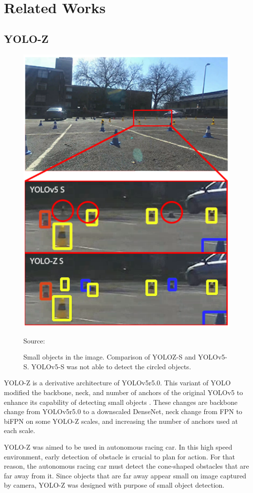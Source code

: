\section{Related Works}
\label{section:relatedwork}

  \subsection{YOLO-Z}
  \begin{figure}[H]
    \centering
    \includegraphics[width=.7\textwidth]{figures/yoloz-result.png}
    \caption*{Source: \textcite{yoloz}}
    \caption{Small objects in the image. Comparison of YOLOZ-S and YOLOv5-S. YOLOv5-S was not able to detect the circled objects.}
    \label{fig:yolozcone}
  \end{figure}
  YOLO-Z is a derivative architecture of YOLOv5r5.0.
  This variant of YOLO modified the backbone, neck, and number of anchors of the original YOLOv5 to 
  enhance its capability of detecting small objects \parencite{yoloz}.
  These changes are backbone change from YOLOv5r5.0 to a downscaled DenseNet,
  neck change from FPN to biFPN on some YOLO-Z scales, and increasing the number of anchors used at each scale.

  YOLO-Z was aimed to be used in autonomous racing car. In this high speed environment, early detection
  of obstacle is crucial to plan for action. For that reason, the autonomous racing car must detect the cone-shaped obstacles
  that are far away from it. Since objects that are far away appear small on image captured by camera, YOLO-Z was designed with
  purpose of small object detection.

